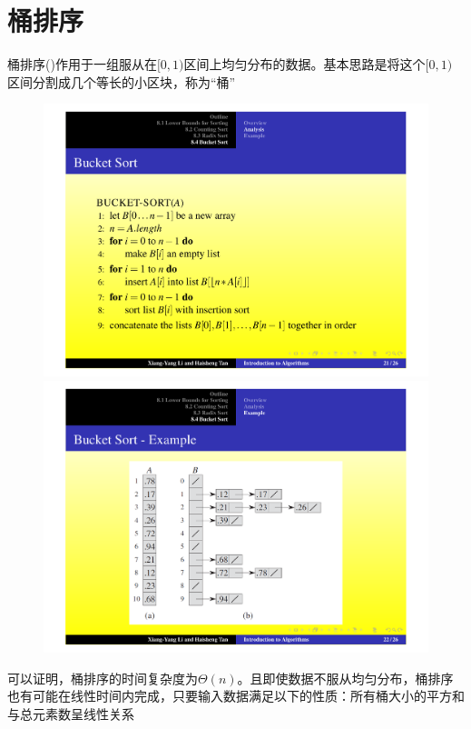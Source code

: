 \documentclass[]{report}
\begin{document}
	\section{桶排序}
		桶排序({})作用于一组服从在$[0,1)$区间上均匀分布的数据。基本思路是将这个$[0,1)$区间分割成几个等长的小区块，称为“桶”
		\begin{figure}[h!]
			\centering
			\begin{minipage}{20em}
				\centering
				\includegraphics[scale = 0.25]{images/Bucket_Sort_Code.pdf}
			\end{minipage}
			\begin{minipage}{20em}
				\centering
				\includegraphics[scale = 0.25]{images/Bucket_Sort_Pic.pdf}
			\end{minipage}
		\end{figure}
		可以证明，桶排序的时间复杂度为$\Theta(n)$。且即使数据不服从均匀分布，桶排序也有可能在线性时间内完成，只要输入数据满足以下的性质：所有桶大小的平方和与总元素数呈线性关系
\end{document}
